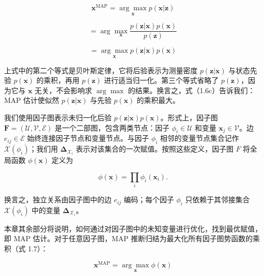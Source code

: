 \begin{equation}
\boldsymbol {x} ^ {\mathrm{MAP}} = \underset {\boldsymbol {x}} {\arg \max} p (\boldsymbol {x} | \boldsymbol {z})\tag{1.6a}
\end{equation}

\begin{equation}
= \arg \max _ {\boldsymbol {x}} \frac {p (\boldsymbol {z} | \boldsymbol {x}) p (\boldsymbol {x})}{p (\boldsymbol {z})}\tag{1.6b}
\end{equation}

\begin{equation}
= \underset {\boldsymbol {x}} {\arg \max} p (\boldsymbol {z} | \boldsymbol {x}) p (\boldsymbol {x})\tag{1.6c}
\end{equation}

上式中的第二个等式是贝叶斯定律，它将后验表示为测量密度 $p(\boldsymbol z|\boldsymbol x)$ 与状态先验 $p(\pmb x)$ 的乘积，再用 $p(\boldsymbol z)$ 进行适当归一化。第三个等式省略了 $p(\boldsymbol z)$，因为它与 $\pmb x$ 无关，不会影响求 $\arg\max$ 的结果。换言之，式（1.6c）告诉我们：MAP 估计使似然 $p(\boldsymbol z|\boldsymbol x)$ 与先验 $p(\pmb x)$ 的乘积最大。

我们使用因子图表示未归一化后验 $p(\pmb z|\pmb x)p(\pmb x)$。形式上，因子图 $\boldsymbol F=(\boldsymbol{\mathcal{U}},\boldsymbol{\mathcal{V}},\boldsymbol{\mathcal{E}})$ 是一个二部图，包含两类节点：因子 $\phi_i\in\mathcal{U}$ 和变量 $\boldsymbol x_j\in\mathcal{V}$。边 $e_{ij}\in\mathcal{E}$ 始终连接因子节点和变量节点。与因子 $\phi_i$ 相邻的变量节点集合记作 $\mathcal{X}(\phi_i)$；我们用 $\boldsymbol\Delta_{\boldsymbol{\mathcal{X}}_i}$ 表示对该集合的一次赋值。按照这些定义，因子图 $F$ 将全局函数 $\phi(\pmb x)$ 定义为

\begin{equation}
\phi (\boldsymbol {x}) = \prod_ {i} \phi_ {i} (\boldsymbol {x} _ {i}).\tag{1.7}
\end{equation}

换言之，独立关系由因子图中的边 $e_{ij}$ 编码；每个因子 $\phi_i$ 只依赖于其邻接集合 $\mathcal{X}(\phi_i)$ 中的变量 $\boldsymbol\Delta_{\boldsymbol{\mathcal{X}}_i}$。

本章其余部分将说明，如何通过对因子图中的未知变量进行优化，找到最优赋值，即 MAP 估计。对于任意因子图，MAP 推断归结为最大化所有因子图势函数的乘积（式 1.7）：

\begin{equation}
\boldsymbol {x} ^ {\mathrm{MAP}} = \underset {\boldsymbol {x}} {\arg \max} \phi (\boldsymbol {x})\tag{1.8a}
\end{equation}

